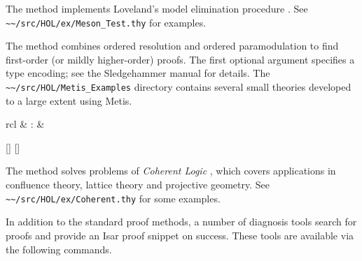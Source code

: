 \begin{isabellebody}
\begin{isamarkuptext}
  The \hyperlink{method.HOL.meson}{\mbox{}} method implements Loveland's model elimination
  procedure \cite{loveland-78}. See \verb|~~/src/HOL/ex/Meson_Test.thy| for
  examples.

  The \hyperlink{method.HOL.metis}{\mbox{}} method combines ordered resolution and ordered
  paramodulation to find first-order (or mildly higher-order) proofs. The first
  optional argument specifies a type encoding; see the Sledgehammer manual
  \cite{isabelle-sledgehammer} for details. The \verb|~~/src/HOL/Metis_Examples| directory contains several small theories
  developed to a large extent using Metis.%
\end{isamarkuptext}%
\isamarkuptrue%
%
\isamarkuptrue%
%
\begin{isamarkuptext}%
\begin{matharray}{rcl}
    \hypertarget{method.HOL.coherent}{\hyperlink{method.HOL.coherent}{\mbox{}}} & : &  \\
  \end{matharray}

  \begin{railoutput}
[]
\rail@bar
{}
[]
\rail@endbar
\rail@end
\end{railoutput}


  The \hyperlink{method.HOL.coherent}{\mbox{}} method solves problems of
  \emph{Coherent Logic} \cite{Bezem-Coquand:2005}, which covers
  applications in confluence theory, lattice theory and projective
  geometry.  See \verb|~~/src/HOL/ex/Coherent.thy| for some
  examples.%
\end{isamarkuptext}%
\isamarkuptrue%
%
\isamarkuptrue%
%
\begin{isamarkuptext}%
In addition to the standard proof methods, a number of diagnosis
  tools search for proofs and provide an Isar proof snippet on success.
  These tools are available via the following commands.


\end{isamarkuptext}
\end{isabellebody}
